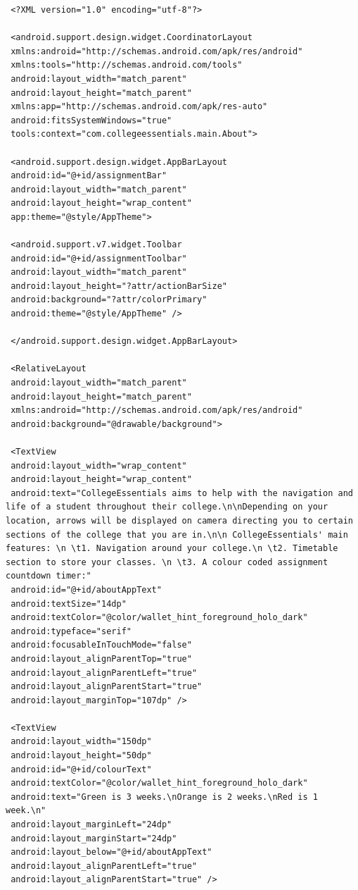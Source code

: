  \begin{verbatim}
 <?XML version="1.0" encoding="utf-8"?>
 
 <android.support.design.widget.CoordinatorLayout
 xmlns:android="http://schemas.android.com/apk/res/android"
 xmlns:tools="http://schemas.android.com/tools"
 android:layout_width="match_parent"
 android:layout_height="match_parent"
 xmlns:app="http://schemas.android.com/apk/res-auto"
 android:fitsSystemWindows="true"
 tools:context="com.collegeessentials.main.About">
 
 <android.support.design.widget.AppBarLayout
 android:id="@+id/assignmentBar"
 android:layout_width="match_parent"
 android:layout_height="wrap_content"
 app:theme="@style/AppTheme">
 
 <android.support.v7.widget.Toolbar
 android:id="@+id/assignmentToolbar"
 android:layout_width="match_parent"
 android:layout_height="?attr/actionBarSize"
 android:background="?attr/colorPrimary"
 android:theme="@style/AppTheme" />
 
 </android.support.design.widget.AppBarLayout>
 
 <RelativeLayout
 android:layout_width="match_parent"
 android:layout_height="match_parent"
 xmlns:android="http://schemas.android.com/apk/res/android"
 android:background="@drawable/background">
 
 <TextView
 android:layout_width="wrap_content"
 android:layout_height="wrap_content"
 android:text="CollegeEssentials aims to help with the navigation and life of a student throughout their college.\n\nDepending on your location, arrows will be displayed on camera directing you to certain sections of the college that you are in.\n\n CollegeEssentials' main features: \n \t1. Navigation around your college.\n \t2. Timetable section to store your classes. \n \t3. A colour coded assignment countdown timer:"
 android:id="@+id/aboutAppText"
 android:textSize="14dp"
 android:textColor="@color/wallet_hint_foreground_holo_dark"
 android:typeface="serif"
 android:focusableInTouchMode="false"
 android:layout_alignParentTop="true"
 android:layout_alignParentLeft="true"
 android:layout_alignParentStart="true"
 android:layout_marginTop="107dp" />
 
 <TextView
 android:layout_width="150dp"
 android:layout_height="50dp"
 android:id="@+id/colourText"
 android:textColor="@color/wallet_hint_foreground_holo_dark"
 android:text="Green is 3 weeks.\nOrange is 2 weeks.\nRed is 1 week.\n"
 android:layout_marginLeft="24dp"
 android:layout_marginStart="24dp"
 android:layout_below="@+id/aboutAppText"
 android:layout_alignParentLeft="true"
 android:layout_alignParentStart="true" />
 

\end{verbatim}
